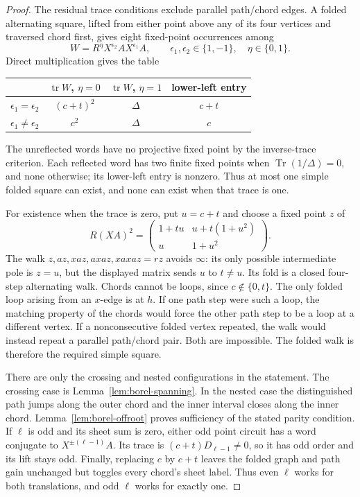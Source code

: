 \documentclass[11pt,a4paper]{article}
\theoremstyle{definition}
\theoremstyle{remark}
\begin{document}
\begin{proof}
The residual trace conditions exclude parallel path/chord edges.  A folded alternating square, lifted from either point above any of its four vertices and traversed chord first, gives eight fixed-point occurrences among
\[
 W=R^\eta X^{\epsilon_2}A X^{\epsilon_1}A,
 \qquad \epsilon_1,\epsilon_2\in\{1,-1\},\quad\eta\in\{0,1\}.
\]
Direct multiplication gives the table
\begin{center}
\begin{tabular}{c|cc|c}
 & $\operatorname{tr}W$, $\eta=0$ & $\operatorname{tr}W$, $\eta=1$ & lower-left entry\\
\hline
$\epsilon_1=\epsilon_2$ & $(c+t)^2$ & $\Delta$ & $c+t$\\
$\epsilon_1\ne\epsilon_2$ & $c^2$ & $\Delta$ & $c$
\end{tabular}
\end{center}
The unreflected words have no projective fixed point by the inverse-trace criterion.  Each reflected word has two finite fixed points when $\operatorname{Tr}(1/\Delta)=0$, and none otherwise; its lower-left entry is nonzero.  Thus at most one simple folded square can exist, and none can exist when that trace is one.

For existence when the trace is zero, put $u=c+t$ and choose a fixed point $z$ of
\[
 R(XA)^2=
 \begin{pmatrix}1+tu&u+t(1+u^2)\\u&1+u^2\end{pmatrix}.
\]
The walk $z,az,xaz,axaz,xaxaz=rz$ avoids $\infty$: its only possible intermediate pole is $z=u$, but the displayed matrix sends $u$ to $t\ne u$.  Its fold is a closed four-step alternating walk.  Chords cannot be loops, since $c\notin\{0,t\}$.  The only folded loop arising from an $x$-edge is at $h$.  If one path step were such a loop, the matching property of the chords would force the other path step to be a loop at a different vertex.  If a nonconsecutive folded vertex repeated, the walk would instead repeat a parallel path/chord pair.  Both are impossible.  The folded walk is therefore the required simple square.

There are only the crossing and nested configurations in the statement.  The crossing case is Lemma~\ref{lem:borel-spanning}.  In the nested case the distinguished path jumps along the outer chord and the inner interval closes along the inner chord.  Lemma~\ref{lem:borel-offroot} proves sufficiency of the stated parity condition.  If $\ell$ is odd and its sheet sum is zero, either odd point circuit has a word conjugate to $X^{\pm(\ell-1)}A$.  Its trace is $(c+t)D_{\ell-1}\ne0$, so it has odd order and its lift stays odd.  Finally, replacing $c$ by $c+t$ leaves the folded graph and path gain unchanged but toggles every chord's sheet label.  Thus even $\ell$ works for both translations, and odd $\ell$ works for exactly one.
\end{proof}
\end{document}
